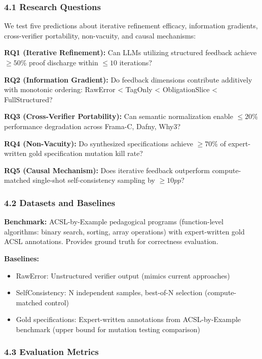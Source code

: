 
\subsubsection{4.1 Research Questions}

We test five predictions about iterative refinement efficacy, information gradients, cross-verifier portability, non-vacuity, and causal mechanisms:

\textbf{RQ1 (Iterative Refinement):} Can LLMs utilizing structured feedback achieve $\geq 50$\% proof discharge within $\leq 10$ iterations?

\textbf{RQ2 (Information Gradient):} Do feedback dimensions contribute additively with monotonic ordering: RawError < TagOnly < ObligationSlice < FullStructured?

\textbf{RQ3 (Cross-Verifier Portability):} Can semantic normalization enable $\leq 20$\% performance degradation across Frama-C, Dafny, Why3?

\textbf{RQ4 (Non-Vacuity):} Do synthesized specifications achieve $\geq 70$\% of expert-written gold specification mutation kill rate?

\textbf{RQ5 (Causal Mechanism):} Does iterative feedback outperform compute-matched single-shot self-consistency sampling by $\geq 10pp$?

\subsubsection{4.2 Datasets and Baselines}

\textbf{Benchmark:} ACSL-by-Example pedagogical programs (function-level algorithms: binary search, sorting, array operations) with expert-written gold ACSL annotations. Provides ground truth for correctness evaluation.

\textbf{Baselines:}
\begin{itemize}
\item RawError: Unstructured verifier output (mimics current approaches)
\item SelfConsistency: N independent samples, best-of-N selection (compute-matched control)
\item Gold specifications: Expert-written annotations from ACSL-by-Example benchmark (upper bound for mutation testing comparison)
\end{itemize}

\subsubsection{4.3 Evaluation Metrics}

